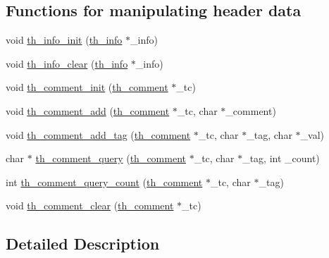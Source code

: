 \subsection*{Functions for manipulating header data}
\begin{DoxyCompactItemize}
\item 
void \hyperlink{group__basefuncs_ga430d9c605816a6ca0bdce3a0b965b926}{th\+\_\+info\+\_\+init} (\hyperlink{structth__info}{th\+\_\+info} $\ast$\+\_\+info)
\item 
void \hyperlink{group__basefuncs_gab3d6441ab4a4969859ef5fd78a9e3c1c}{th\+\_\+info\+\_\+clear} (\hyperlink{structth__info}{th\+\_\+info} $\ast$\+\_\+info)
\item 
void \hyperlink{group__basefuncs_ga6c8ab25988e7ea9d7b1e31a54cf58f09}{th\+\_\+comment\+\_\+init} (\hyperlink{structth__comment}{th\+\_\+comment} $\ast$\+\_\+tc)
\item 
void \hyperlink{group__basefuncs_ga19a1f7b8032db957df151a34e5ac9272}{th\+\_\+comment\+\_\+add} (\hyperlink{structth__comment}{th\+\_\+comment} $\ast$\+\_\+tc, char $\ast$\+\_\+comment)
\item 
void \hyperlink{group__basefuncs_ga6c5edc201ca220a30787ca6c1ddcaeaf}{th\+\_\+comment\+\_\+add\+\_\+tag} (\hyperlink{structth__comment}{th\+\_\+comment} $\ast$\+\_\+tc, char $\ast$\+\_\+tag, char $\ast$\+\_\+val)
\item 
char $\ast$ \hyperlink{group__basefuncs_ga33c8b4f57a03217636d704c2ebb211fa}{th\+\_\+comment\+\_\+query} (\hyperlink{structth__comment}{th\+\_\+comment} $\ast$\+\_\+tc, char $\ast$\+\_\+tag, int \+\_\+count)
\item 
int \hyperlink{group__basefuncs_ga81d518dc4426f63ceaedcbe2668679fc}{th\+\_\+comment\+\_\+query\+\_\+count} (\hyperlink{structth__comment}{th\+\_\+comment} $\ast$\+\_\+tc, char $\ast$\+\_\+tag)
\item 
void \hyperlink{group__basefuncs_gae736c1afa514947a3feb223143af95e3}{th\+\_\+comment\+\_\+clear} (\hyperlink{structth__comment}{th\+\_\+comment} $\ast$\+\_\+tc)
\end{DoxyCompactItemize}


\subsection{Detailed Description}


